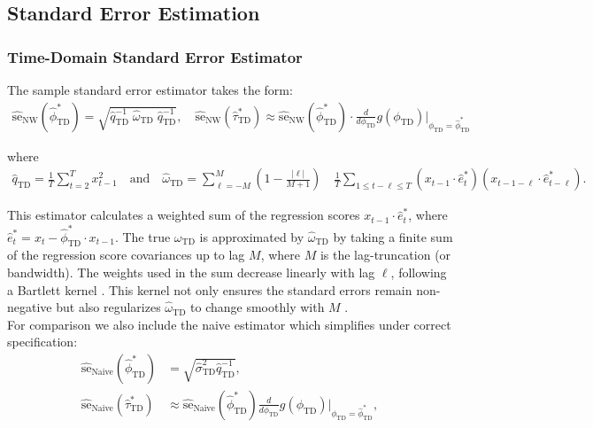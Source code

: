 \documentclass[9pt]{article}
\newcommand{\phitd}{\phi_{\scriptscriptstyle\text{TD}}}
\newcommand{\hatphitd}{\hat{\phi}^*_{\scriptscriptstyle\text{TD}}}
\newcommand{\hattautd}{\hat{\tau}^*_{\scriptscriptstyle\text{TD}}}
\newcommand{\hatqtd}{\hat{q}_{\scriptscriptstyle\text{TD}}}
\newcommand{\omegatd}{\omega_{\scriptscriptstyle\text{TD}}}
\newcommand{\hatomegatd}{\hat{\omega}_{\scriptscriptstyle\text{TD}}}
\newcommand{\hatsigmatd}{\hat{\sigma}_{\scriptscriptstyle\text{TD}}}
\begin{document}
\subsection{Standard Error Estimation}\label{sec:stderr_}
\subsubsection{Time-Domain Standard Error Estimator}\label{sec:stderr-time-domain_}
The sample standard error estimator takes the form:
\begin{align}\label{eq:stderr-time-domain_}
\widehat{\text{se}}_{\text{NW}}(\hatphitd) = \sqrt{\hatqtd^{-1}\;\hatomegatd\; \hatqtd^{-1}}, \quad
\widehat{\text{se}}_{\text{NW}}(\hattautd) \approx \widehat{\text{se}}_{\text{NW}}(\hatphitd) \cdot \frac{d}{d\phitd} g(\phitd)\big|_{\phitd=\hatphitd}
\end{align}

\noindent where
\begin{align}\label{eq:lls_q_omega_}
    \hatqtd = \frac{1}{T} \sum_{t=2}^T x_{t-1}^2 \quad\text{and}\quad
    \hatomegatd = \sum_{\ell=-M}^M \left(1 - \frac{|\ell|}{M+1}\right) \quad \frac{1}{T} \sum_{1\le t - \ell \le T} (x_{t-1} \cdot \hat e_t^*)(x_{t-1-\ell} \cdot \hat e_{t-\ell}^*).
\end{align}

\noindent This estimator calculates a weighted sum of the regression scores $x_{t-1} \cdot \hat e_t^*$, where $\hat e_t^* = x_t - \hatphitd \cdot x_{t-1}$. The true $\omegatd$ is approximated by $\hatomegatd$ by taking a finite sum of the regression score covariances up to lag $M$, where $M$ is the lag-truncation (or bandwidth). The weights used in the sum decrease linearly with lag $\ell$, following a Bartlett kernel \citep{newey_simple_1987}. This kernel not only ensures the standard errors remain non-negative but also regularizes $\hatomegatd$ to change smoothly with $M$ \citep[Chapter~14.35]{hansen_econometrics_2022}.\\

\noindent For comparison we also include the naive estimator which simplifies under correct specification:
\begin{align}
    \widehat{\text{se}}_\text{Naive}(\hatphitd) &= \sqrt{\hatsigmatd^2 \hatqtd^{-1}},\\
    \widehat{\text{se}}_\text{Naive}(\hattautd) &\approx \widehat{\text{se}}_{\text{Naive}}(\hatphitd) \frac{d}{d\phitd} g(\phitd)\big|_{\phitd=\hatphitd},
\end{align}
\end{document}
